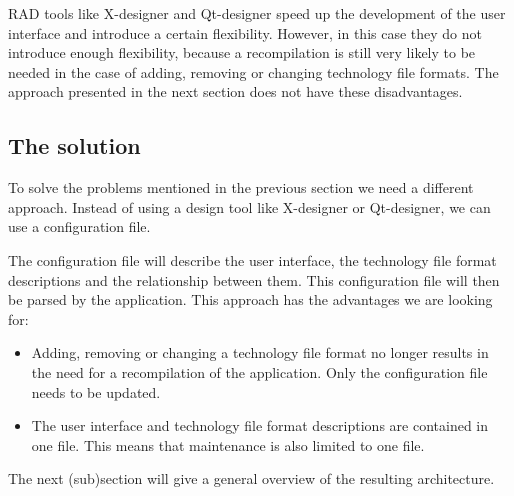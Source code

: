 \bigskip \noindent
RAD tools like X-designer and Qt-designer speed up the development of the user
interface and introduce a certain flexibility. However, in this case they do
not introduce enough flexibility, because a recompilation is still very likely
to be needed in the case of adding, removing or changing technology file
formats. The approach presented in the next section does not have these
disadvantages.

\subsection{The solution} \label{sect:design:solution}
To solve the problems mentioned in the previous section we need a different
approach. Instead of using a design tool like X-designer or Qt-designer, we can
use a configuration file.

The configuration file will describe the user interface, the technology file
format descriptions and the relationship between them. This configuration file
will then be parsed by the application. This approach has the advantages we are
looking for:
\begin{itemize}
\item Adding, removing or changing a technology file format no longer results
in the need for a recompilation of the application. Only the configuration file
needs to be updated.
\item The user interface and technology file format descriptions are contained in one file.
This means that maintenance is also limited to one file.
\end{itemize}
The next (sub)section will give a general overview of the resulting
architecture.

